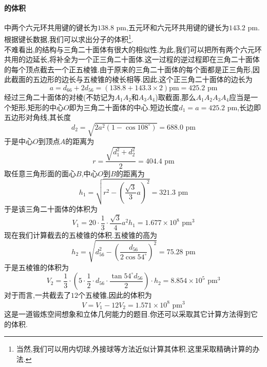 \documentclass[draft]{ctexart}
\begin{document}
\paragraph{的体积}
中两个六元环共用键的键长为$138.8\text{ pm}$,五元环和六元环共用键的键长为$143.2\text{ pm}$.根据键长数据,我们可以求出分子的体积\footnote{当然,我们可以用内切球,外接球等方法近似计算其体积.这里采取精确计算的办法.}.\\
\indent 不难看出,的结构与三角二十面体有很大的相似性.为此,我们可以把所有两个六元环共用的边延长,将补全为一个正三角二十面体.这一过程的逆过程即在三角二十面体的每个顶点截去一个正五棱锥.由于原来的三角二十面体的每个面都是正三角形,因此截面的五边形的边长与五棱锥的棱长相等.因此,这个正三角二十面体的边长为
\[a=d_{66}+2d_{56}=(138.8+143.3\times2)\text{pm}=425.2\text{ pm}\]
经过三角二十面体的对棱(不妨记为$A_1A_2$和$A_3A_4$)取截面,那么$A_1A_2A_3A_4$应当是一个矩形,矩形的中心$O$即为三角二十面体的中心.短边长度$d_1=a=425.2\text{ pm}$,长边即五边形对角线,其长度
\[d_2=\sqrt{2a^2\left(1-\cos108^\circ\right)}=688.0\text{ pm}\]
于是中心$O$到顶点$A$的距离为
\[r=\dfrac{\sqrt{d_1^2+d_2^2}}{2}=404.4\text{ pm}\]
取任意三角形面的面心$B$,中心$O$到$B$的距离为
\[h_1=\sqrt{r^2-\left(\dfrac{\sqrt3}{3}a\right)^2}=321.3\text{ pm}\]
于是该三角二十面体的体积为
\[V_1=20\cdot\dfrac13\cdot\dfrac{\sqrt3}{4}a^2h_1=1.677\times10^{8}\text{ pm}^3\]
\indent 现在我们计算截去的五棱锥的体积.五棱锥的高为
\[h_2=\sqrt{d_{56}^2-\left(\dfrac{d_{56}}{2\cos54^\circ}\right)^2}=75.28\text{ pm}\]
于是五棱锥的体积为
\[V_2=\dfrac13\cdot\left(5\cdot\dfrac12\cdot d_{56}\cdot\dfrac{\tan54^\circ d_{56}}{2}\right)\cdot h_2=8.854\times10^5\text{ pm}^3\]
\indent 对于而言,一共截去了$12$个五棱锥,因此的体积为
\[V=V_1-12V_2=1.571\times10^{8}\text{ pm}^3\]
\indent 这是一道锻炼空间想象和立体几何能力的题目.你还可以采取其它计算方法得到它的体积.
\end{document}

